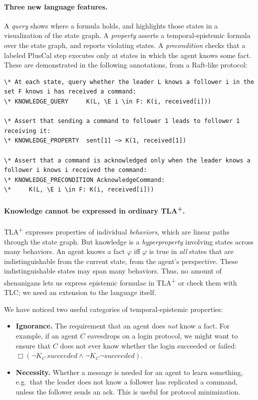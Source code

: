\documentclass[10pt]{article}
\newcommand{\K}[1]{K_{#1}}
\begin{document}
\paragraph{Three new language features.}
A \emph{query} shows where a formula holds, and highlights those states in a visualization of the state graph.
A \emph{property} asserts a temporal-epistemic formula over the state graph, and reports violating states.
A \emph{precondition} checks that a labeled PlusCal step executes only at states in which the agent knows some fact.
These are demonstrated in the following annotations, from a Raft-like protocol:
\vspace{1em}
\begin{lstlisting}
\* At each state, query whether the leader L knows a follower i in the set F knows i has received a command:
\* KNOWLEDGE_QUERY     K(L, \E i \in F: K(i, received[i]))

\* Assert that sending a command to follower 1 leads to follower 1 receiving it:
\* KNOWLEDGE_PROPERTY  sent[1] ~> K(1, received[1])

\* Assert that a command is acknowledged only when the leader knows a follower i knows i received the command:
\* KNOWLEDGE_PRECONDITION AcknowledgeCommand:
\*     K(L, \E i \in F: K(i, received[i]))
\end{lstlisting}

\paragraph{Knowledge cannot be expressed in ordinary TLA\textsuperscript{+}.}
TLA\textsuperscript{+} expresses properties of individual \emph{behaviors}, which are linear paths through the state graph. But knowledge is a \emph{hyperproperty} involving states across many behaviors. An agent knows a fact $\varphi$ iff $\varphi$ is true in \emph{all} states that are indistinguishable from the current state, from the agent's perspective. These indistinguishable states may span many behaviors. Thus, no amount of shenanigans lets us express epistemic formulae in TLA\textsuperscript{+} or check them with TLC; we need an extension to the language itself.

We have noticed two useful categories of temporal-epistemic properties:
\vspace{1em}
\begin{itemize}
\item \textbf{Ignorance.} The requirement that an agent does \emph{not} know a fact. For example, if an agent $C$ eavesdrops on a login protocol, we might want to ensure that $C$ does not ever know whether the login succeeded or failed: $\Box(\lnot\K{C}\,\mathit{succeeded}\land\lnot\K{C}\lnot\mathit{succeeded})$.
\item \textbf{Necessity.} Whether a message is needed for an agent to learn something, e.g.\ that the leader does not know a follower has replicated a command, unless the follower sends an ack. This is useful for protocol minimization.
\end{itemize}
\end{document}
